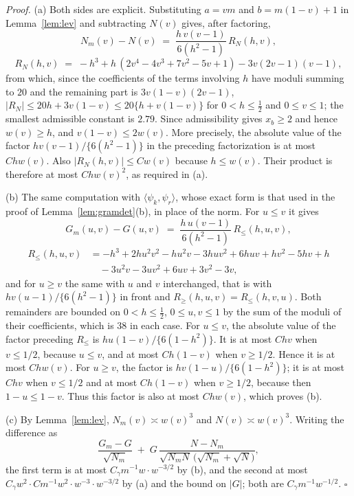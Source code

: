 \documentclass[12pt, a4paper]{article}
\newcommand{\qed}{\hfill$\square$}
\newenvironment{proof}[1][Proof]{\par\noindent\textit{#1.}\space}{\qed\par\medskip}
\begin{document}
\begin{proof}
(a) Both sides are explicit. Substituting $a = vm$ and $b = m(1-v)+1$ in
Lemma~\ref{lem:lev} and subtracting $N(v)$ gives, after factoring,
\[
N_m(v) - N(v) \;=\; \frac{h\,v(v-1)}{6(h^2-1)}\, R_N(h,v),
\]
\[
R_N(h,v) \;=\; -h^3 + h\,(2v^4-4v^3+7v^2-5v+1) - 3v(2v-1)(v-1) ,
\]
from which, since the coefficients of the terms involving $h$ have moduli summing to $20$ and the remaining part is $3v(1-v)(2v-1)$, $|R_N| \le 20h + 3v(1-v) \le 20\{h+v(1-v)\}$ for $0<h\le\tfrac12$ and $0\le v\le1$; the smallest admissible constant is $2.79$. Since
admissibility gives $x_b \ge 2$ and hence $w(v) \ge h$, and
$v(1-v) \le 2w(v)$. More precisely, the absolute value of the factor
$h v(v-1)/\{6(h^2-1)\}$ in the preceding factorization is at most
$C h w(v)$. Also $|R_N(h,v)|\le Cw(v)$ because $h\le w(v)$. Their product is
therefore at most $C h w(v)^2$, as required in (a).

(b) The same computation with $\langle\psi_k,\psi_r\rangle$, whose exact form is that used in the proof of Lemma~\ref{lem:gramdet}(b), in place of the norm. For $u \le v$ it gives
\[
G_m(u,v) - G(u,v) \;=\; \frac{h\,u(v-1)}{6(h^2-1)}\, R_{\le}(h,u,v) ,
\]
\begin{align*}
R_{\le}(h,u,v) &= -h^3 + 2hu^2v^2 - hu^2v - 3huv^2 + 6huv + hv^2 - 5hv + h \\
&\quad - 3u^2v - 3uv^2 + 6uv + 3v^2 - 3v ,
\end{align*}
and for $u \ge v$ the same with $u$ and $v$ interchanged, that is with
$h v(u-1)/\{6(h^2-1)\}$ in front and
$R_{\ge}(h,u,v)=R_{\le}(h,v,u)$. Both remainders are bounded on
$0<h\le\tfrac12$, $0\le u,v\le1$ by the sum of the moduli of their
coefficients, which is $38$ in each case. For $u\le v$, the absolute value of
the factor preceding $R_{\le}$ is
$h u(1-v)/\{6(1-h^2)\}$. It is at most $Chv$ when $v\le1/2$, because
$u\le v$, and at most $Ch(1-v)$ when $v\ge1/2$. Hence it is at most
$Chw(v)$. For $u\ge v$, the factor is
$h v(1-u)/\{6(1-h^2)\}$; it is at most $Chv$ when $v\le1/2$ and at most
$Ch(1-v)$ when $v\ge1/2$, because then $1-u\le1-v$. Thus this factor is also
at most $Chw(v)$, which proves (b).

(c) By Lemma~\ref{lem:lev}, $N_m(v) \asymp w(v)^3$ and $N(v) \asymp w(v)^3$.
Writing the difference as
\[
\frac{G_m - G}{\sqrt{N_m}} \;+\; G\,\frac{N - N_m}
{\sqrt{N_m N}\,\big(\sqrt{N_m} + \sqrt{N}\big)} ,
\]
the first term is at most $C_\gamma m^{-1}w \cdot w^{-3/2}$ by (b), and the
second at most $C_\gamma w^2 \cdot C m^{-1}w^2 \cdot w^{-3}\cdot w^{-3/2}$ by
(a) and the bound on $|G|$; both are $C_\gamma m^{-1} w^{-1/2}$.
\end{proof}
\end{document}
